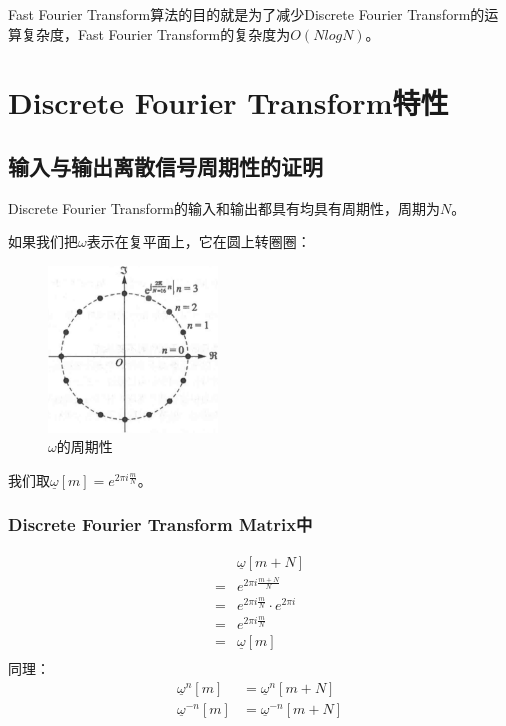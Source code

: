 Fast Fourier Transform算法的目的就是为了减少Discrete Fourier Transform的运算复杂度，Fast Fourier Transform的复杂度为$O(NlogN)$。
\section{Discrete Fourier Transform特性}
\subsection{输入与输出离散信号周期性的证明}
Discrete Fourier Transform的输入和输出都具有均具有周期性，周期为$N$。

如果我们把$\omega$表示在复平面上，它在圆上转圈圈：
\begin{figure}[H]
	\centering
	\includegraphics[width=0.4\textwidth]{assets/omega.png}
	\caption{$\omega$的周期性}
\end{figure}

我们取$\underline{\omega}[m] =e^{2\pi i \frac{m}{N}} $。
\subsubsection{Discrete Fourier Transform Matrix中}
\begin{align*}
	  & \underline{\omega}[m+N]               \\
	= & e^{2\pi i\frac{m+N}{N}}               \\
	= & e^{2\pi i\frac{m}{N}}\cdot e^{2\pi i} \\
	= & e^{2\pi i\frac{m}{N}}                 \\
	= & \underline{\omega}[m]                 \\
\end{align*}
同理：
\begin{align*}
	\underline{\omega}^{n}[m]  & = \underline{\omega}^n[m+N]    \\
	\underline{\omega}^{-n}[m] & = \underline{\omega}^{-n}[m+N]
\end{align*}


